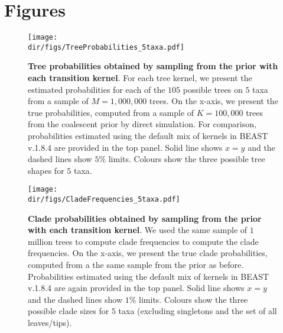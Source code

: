\clearpage
\section*{Figures}
\begin{figure}[!ht]
\centering
\texttt{[image: \\dir/figs/TreeProbabilities\_5taxa.pdf]}
\caption[Tree probabilities obtained by sampling from the prior with each transition kernel.]{\textbf{Tree probabilities obtained by sampling from the prior with each transition kernel}.
For each tree kernel, we present the estimated probabilities for each of the $105$ possible trees on $5$ taxa from a sample of $M = 1, 000, 000$  trees.
On the x-axis, we present the true probabilities, computed from a sample of $K = 100, 000$ trees from the coalescent prior by direct simulation.
For comparison, probabilities estimated using the default mix of kernels in BEAST v.1.8.4 are provided in the top panel.
Solid line shows $x=y$ and the dashed lines show $5\%$ limits.
Colours show the three possible tree shapes for $5$ taxa.
}
\label{fig:treeP}
\end{figure}
\begin{figure}[!ht]
\centering
\texttt{[image: \\dir/figs/CladeFrequencies\_5taxa.pdf]}
\caption[Clade probabilities obtained by sampling from the prior with each transition kernel.]{\textbf{Clade probabilities obtained by sampling from the prior with each transition kernel}.
We used the same sample of $1$ million trees to compute clade frequencies to compute the clade frequencies.
On the x-axis, we present the true clade probabilities, computed from a the same sample from the prior as before.
Probabilities estimated using the default mix of kernels in BEAST v.1.8.4 are again provided in the top panel.
Solid line shows $x=y$ and the dashed lines show $1\%$ limits.
Colours show the three possible clade sizes for $5$ taxa (excluding singletons and the set of all leaves/tips).
}
\label{fig:cladeP}
\end{figure}
